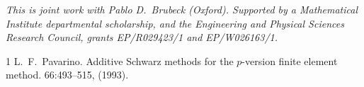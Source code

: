 \documentclass[a4paper]{amsart}
\begin{document}
\emph{This is joint work with Pablo D.~Brubeck (Oxford).
Supported by a Mathematical Institute departmental scholarship, and the Engineering and Physical Sciences Research Council, grants EP/R029423/1 and EP/W026163/1.}

\begin{thebibliography}{1}
L.~F.~Pavarino.
\newblock Additive {S}chwarz methods for the $p$-version finite element method.
 66:493–515, (1993).
\end{thebibliography}
\end{document}
